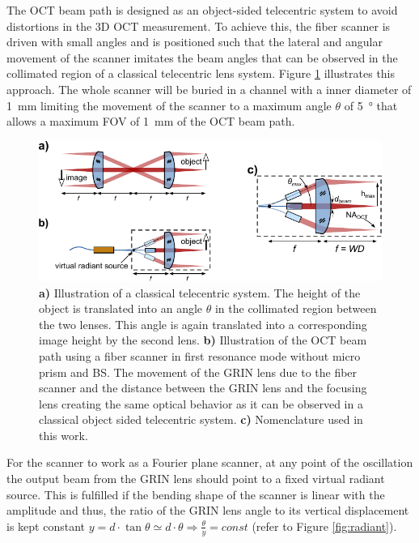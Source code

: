 The OCT beam path is designed as an object-sided telecentric system to avoid distortions in the 3D OCT measurement. To achieve this, the fiber scanner is driven with small angles and is positioned such that the lateral and angular movement of the scanner imitates the beam angles that can be observed in the collimated region of a classical telecentric lens system. Figure \ref{fig:fps} illustrates this approach. The whole scanner will be buried in a channel with a inner diameter of \SI{1}{\milli\meter} limiting the movement of the scanner to a maximum angle $\theta$ of \SI{5}{\degree} that allows a maximum FOV of \SI{1}{\milli\meter} of the OCT beam path.



\begin{figure}[h!]\centering \includegraphics[width=\columnwidth]{figures/30_DesignSimulation/fps.pdf}
      \caption{\textbf{a)} Illustration of a classical telecentric system. The height of the object is translated into an angle $\theta$ in the collimated region between the two lenses. This angle is again translated into a corresponding image height by the second lens. \textbf{b)} Illustration of the OCT beam path using a fiber scanner in first resonance mode without micro prism and BS. The movement of the GRIN lens due to the fiber scanner and the distance between the GRIN lens and the focusing lens creating the same optical behavior as it can be observed in a classical object sided telecentric system. \textbf{c)} Nomenclature used in this work.}
      \label{fig:fps}
\end{figure}

For the scanner to work as a Fourier plane scanner, at any point of the oscillation the output beam from the GRIN lens should point to a fixed virtual radiant source. This is fulfilled if the bending shape of the scanner is linear with the amplitude and thus, the ratio of the GRIN lens angle to its vertical displacement is kept constant $ y = d \cdot \tan \theta \simeq d \cdot \theta \Rightarrow \frac{\theta}{y} = const $ (refer to Figure \ref{fig:radiant}).

